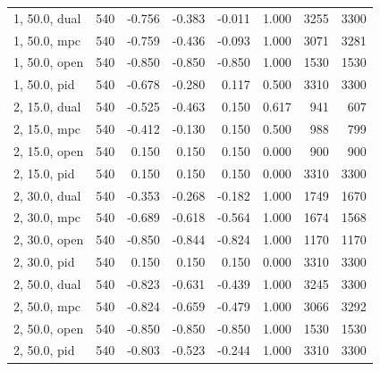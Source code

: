 \begin{longtable}{lrrrrrrr}
1, 50.0, dual & 540 & -0.756 & -0.383 & -0.011 & 1.000 & 3255 & 3300 \\
1, 50.0, mpc & 540 & -0.759 & -0.436 & -0.093 & 1.000 & 3071 & 3281 \\
1, 50.0, open & 540 & -0.850 & -0.850 & -0.850 & 1.000 & 1530 & 1530 \\
1, 50.0, pid & 540 & -0.678 & -0.280 & 0.117 & 0.500 & 3310 & 3300 \\
2, 15.0, dual & 540 & -0.525 & -0.463 & 0.150 & 0.617 & 941 & 607 \\
2, 15.0, mpc & 540 & -0.412 & -0.130 & 0.150 & 0.500 & 988 & 799 \\
2, 15.0, open & 540 & 0.150 & 0.150 & 0.150 & 0.000 & 900 & 900 \\
2, 15.0, pid & 540 & 0.150 & 0.150 & 0.150 & 0.000 & 3310 & 3300 \\
2, 30.0, dual & 540 & -0.353 & -0.268 & -0.182 & 1.000 & 1749 & 1670 \\
2, 30.0, mpc & 540 & -0.689 & -0.618 & -0.564 & 1.000 & 1674 & 1568 \\
2, 30.0, open & 540 & -0.850 & -0.844 & -0.824 & 1.000 & 1170 & 1170 \\
2, 30.0, pid & 540 & 0.150 & 0.150 & 0.150 & 0.000 & 3310 & 3300 \\
2, 50.0, dual & 540 & -0.823 & -0.631 & -0.439 & 1.000 & 3245 & 3300 \\
2, 50.0, mpc & 540 & -0.824 & -0.659 & -0.479 & 1.000 & 3066 & 3292 \\
2, 50.0, open & 540 & -0.850 & -0.850 & -0.850 & 1.000 & 1530 & 1530 \\
2, 50.0, pid & 540 & -0.803 & -0.523 & -0.244 & 1.000 & 3310 & 3300 \\
\bottomrule
\end{longtable}

